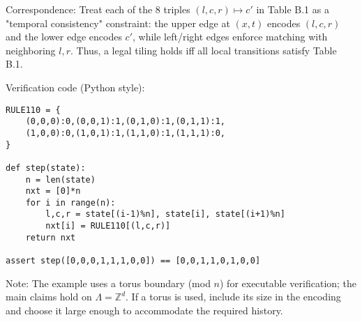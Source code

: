 \documentclass[12pt]{article}
\theoremstyle{plain}
\theoremstyle{definition}
\begin{document}
Correspondence: Treat each of the 8 triples $(l,c,r)\mapsto c'$ in Table B.1 as a "temporal consistency" constraint: the upper edge at $(x,t)$ encodes $(l,c,r)$ and the lower edge encodes $c'$, while left/right edges enforce matching with neighboring $l,r$. Thus, a legal tiling holds iff all local transitions satisfy Table B.1.

Verification code (Python style):

\begin{lstlisting}
RULE110 = {
    (0,0,0):0,(0,0,1):1,(0,1,0):1,(0,1,1):1,
    (1,0,0):0,(1,0,1):1,(1,1,0):1,(1,1,1):0,
}

def step(state):
    n = len(state)
    nxt = [0]*n
    for i in range(n):
        l,c,r = state[(i-1)%n], state[i], state[(i+1)%n]
        nxt[i] = RULE110[(l,c,r)]
    return nxt

assert step([0,0,0,1,1,1,0,0]) == [0,0,1,1,0,1,0,0]
\end{lstlisting}

Note: The example uses a torus boundary (mod $n$) for executable verification; the main claims hold on $\Lambda=\mathbb{Z}^d$. If a torus is used, include its size in the encoding and choose it large enough to accommodate the required history.
\end{document}
